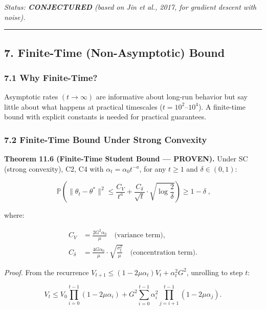 \documentclass[
  12pt,
]{article}
\begin{document}
\emph{Status: \textbf{CONJECTURED} (based on Jin et al., 2017, for
gradient descent with noise).}

\begin{center}\rule{0.5\linewidth}{0.5pt}\end{center}

\subsection{7. Finite-Time (Non-Asymptotic)
Bound}\label{finite-time-non-asymptotic-bound}

\subsubsection{7.1 Why Finite-Time?}\label{why-finite-time}

Asymptotic rates \((t \to \infty)\) are informative about long-run
behavior but say little about what happens at practical timescales
(\(t = 10^2\)--\(10^4\)). A finite-time bound with explicit constants is
needed for practical guarantees.

\subsubsection{7.2 Finite-Time Bound Under Strong
Convexity}\label{finite-time-bound-under-strong-convexity}

\textbf{Theorem 11.6 (Finite-Time Student Bound --- PROVEN).} Under SC
(strong convexity), C2, C4 with \(\alpha_t = \alpha_0 t^{-a}\), for any
\(t \geq 1\) and \(\delta \in (0, 1)\):

\[\boxed{\;\mathbb{P}\!\left(\|\theta_t - \theta^*\|^2 \leq \frac{C_V}{t^a} + \frac{C_{\delta}}{\sqrt{t}} \cdot \sqrt{\log\frac{2}{\delta}}\right) \geq 1 - \delta\;},\]

where:

\[\begin{aligned}
C_V &= \frac{2 G^2 \alpha_0}{\mu} \quad \text{(variance term)}, \\
C_{\delta} &= \frac{4 G \alpha_0}{\mu} \cdot \sqrt{\frac{\sigma_\xi^2}{\mu}} \quad \text{(concentration term)}.
\end{aligned}\]

\emph{Proof.} From the recurrence
\(V_{t+1} \leq (1 - 2\mu\alpha_t) V_t + \alpha_t^2 G^2\), unrolling to
step \(t\):

\[V_t \leq V_0 \prod_{i=0}^{t-1}(1 - 2\mu\alpha_i) + G^2 \sum_{i=0}^{t-1} \alpha_i^2 \prod_{j=i+1}^{t-1} (1 - 2\mu\alpha_j).\]
\end{document}
